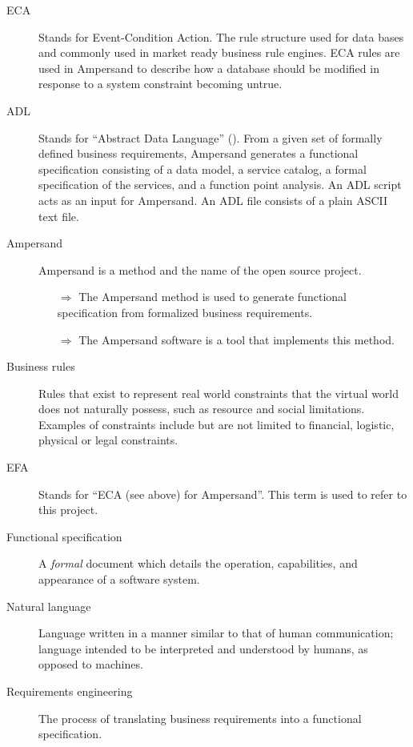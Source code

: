 \documentclass[12pt]{report}
\begin{document}
\begin{description}
\item[ECA] Stands for Event-Condition Action. The rule structure used for data
  bases and commonly used in market ready business rule engines. ECA rules are
  used in Ampersand to describe how a database should be modified in response to
  a system constraint becoming untrue.
  
\item [ADL] Stands for ``Abstract Data Language'' (\cite[13]{derFun}). From a
given set of formally defined business requirements, Ampersand generates a
functional specification consisting of a data model, a service catalog, a
formal specification of the services, and a function point analysis. An ADL
script acts as an input for Ampersand. An ADL file consists of a plain ASCII
text file.
\item [Ampersand] Ampersand is a method and the name of the open source 
project. 
    \begin{itemize}
        \item[$\Rightarrow$] The Ampersand method is used to generate
        functional specification from formalized business requirements.
        \item[$\Rightarrow$] The Ampersand software is a tool that implements 
        this method.
    \end{itemize} 
    
\item [Business rules] Rules that exist to represent real world 
constraints that the virtual world does not naturally possess, such as resource 
and social limitations. Examples of constraints include but are not limited to 
financial, logistic, physical or legal constraints.

\item [EFA] Stands for ``ECA (see above) for Ampersand''. This term is used to 
refer to this project. 
\item [Functional specification] A \emph{formal} document which details the 
operation, capabilities, and appearance of a software system. 

\item [Natural language] Language written in a manner similar to that of human 
communication; 
  language intended to be interpreted and understood by humans, as opposed to 
  machines. 
  
\item [Requirements engineering] The process of translating business
requirements into a functional specification. 
\end{description}
\end{document}
